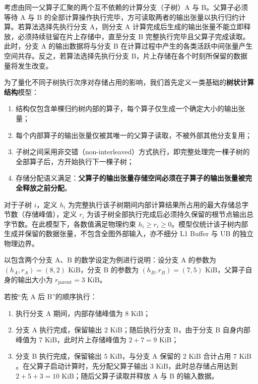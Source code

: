 \documentclass[anonymous,withtoc]{gmcm2026}
\providecommand{\tightlist}{\setlength{\itemsep}{0pt}\setlength{\parskip}{0pt}}
\begin{document}
考虑由同一父算子汇聚的两个互不依赖的计算分支（子树）A 与 B。父算子必须等待 A 与 B 的全部计算操作执行完毕，方可读取两者的输出张量以执行归约计算。若算法选择先执行分支 A，则分支 A 计算完成后生成的输出张量不能立即释放，必须持续驻留在片上存储中，直至分支 B 完整执行完毕且父算子完成读取。此时，分支 A 的输出数据将与分支 B 在计算过程中产生的各类活跃中间张量产生空间共存。反之，若算法选择先执行分支 B，片上存储在各个时刻所保留的数据量将发生改变。

为了量化不同子树执行次序对存储占用的影响，我们首先定义一类基础的\textbf{树状计算结构}模型：

\begin{enumerate}
\def\labelenumi{\arabic{enumi}.}
\tightlist
\item
  结构仅包含单棵归约树内部的算子，每个算子仅生成一个确定大小的输出张量；
\item
  每个内部算子的输出张量仅被其唯一的父算子读取，不被外部其他分支复用；
\item
  子树之间采用非交错（non-interleaved）方式执行，即完整处理完一棵子树的全部算子后，方开始执行下一棵子树；
\item
  存储分配语义满足：\textbf{父算子的输出张量存储空间必须在子算子的输出张量被完全释放之前分配}。
\end{enumerate}

对于子树 \(i\)，定义 \(h_i\) 为完整执行该子树期间内部计算结果所占用的最大存储总字节数（存储峰值），定义 \(r_i\) 为该子树全部执行完成后必须持久保留的根节点输出总字节数。在此模型下，各数值满足物理约束 \(h_i \ge r_i \ge 0\)。模型仅统计该子树内部生成并保留的数据张量，不包含全图外部输入，亦不细分 L1 Buffer 与 UB 的独立物理边界。

以包含两个分支 A、B 的数学设定为例进行说明：设分支 A 的参数为 \((h_A, r_A) = (8, 2)\text{ KiB}\)，分支 B 的参数为 \((h_B, r_B) = (7, 5)\text{ KiB}\)，父算子自身的输出大小为 \(r_{\mathrm{parent}} = 3\text{ KiB}\)。

若按``先 A 后 B''的顺序执行：

\begin{enumerate}
\def\labelenumi{\arabic{enumi}.}
\tightlist
\item
  执行分支 A 期间，内部存储峰值为 \(8\text{ KiB}\)；
\item
  分支 A 执行完成，保留输出 \(2\text{ KiB}\)；随后执行分支 B，由于分支 B 自身内部峰值为 \(7\text{ KiB}\)，此时片上存储峰值为 \(2 + 7 = 9\text{ KiB}\)；
\item
  分支 B 执行完成，保留输出 \(5\text{ KiB}\)，与分支 A 保留的 \(2\text{ KiB}\) 合计占用 \(7\text{ KiB}\)。在父算子启动计算时，先分配父算子输出 \(3\text{ KiB}\)，此时总存储占用达到 \(2 + 5 + 3 = 10\text{ KiB}\)；随后父算子读取并释放 A 与 B 的输入数据。
\end{enumerate}
\end{document}

